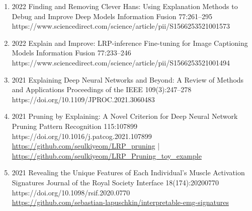 {\begin{enumerate}
    \item {}
                        {2022}
                        {Finding and Removing Clever Hans: Using Explanation Methods to Debug and Improve Deep Models}
                        {Information Fusion}
                        {77:261--295}
                        {https://www.sciencedirect.com/science/article/pii/S1566253521001573}


    \item {}
                       {2022}
                       {Explain and Improve: LRP-inference Fine-tuning for Image Captioning Models}
                       {Information Fusion}
                       {77:233--246}
                       {https://www.sciencedirect.com/science/article/pii/S1566253521001494}

    \item {}
                        {2021}
                        {Explaining Deep Neural Networks and Beyond: A Review of Methods and Applications}
                        {Proceedings of the IEEE}
                        {109(3):247--278}
                        {https://doi.org/10.1109/JPROC.2021.3060483}

    \item {}
                        {2021}
                        {Pruning by Explaining: A Novel Criterion for Deep Neural Network Pruning}
                        {Pattern Recognition}
                        {115:107899}
                        {https://doi.org/10.1016/j.patcog.2021.107899}
                        {\\\href{https://github.com/seulkiyeom/LRP_pruning}{https://github.com/seulkiyeom/LRP\_pruning}
                         | \href{https://github.com/seulkiyeom/LRP_Pruning_toy_example}{https://github.com/seulkiyeom/LRP\_Pruning\_toy\_example}}

    \item {}
                        {2021}
                        {Revealing the Unique Features of Each Individual's Muscle Activation Signatures}
                        {Journal of the Royal Society Interface}
                        {18(174):20200770}
                        {https://doi.org/10.1098/rsif.2020.0770}
                        {\\\href{https://github.com/sebastian-lapuschkin/interpretable-emg-signatures}{https://github.com/sebastian-lapuschkin/interpretable-emg-signatures}}


\end{enumerate}}
